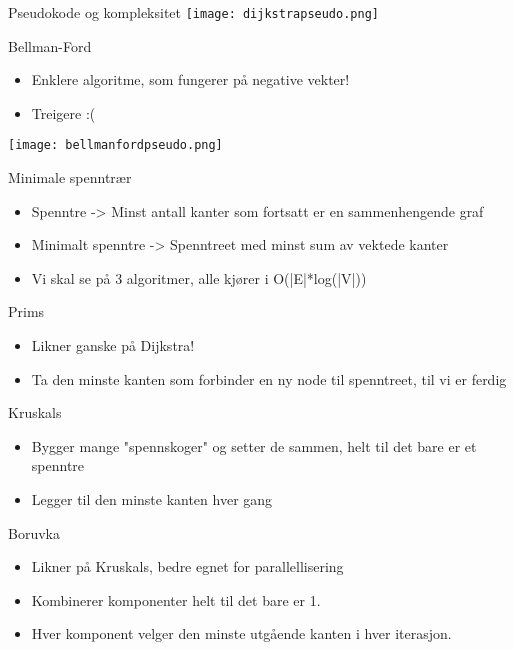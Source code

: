 \documentclass[norsk, handout]{beamer}
\begin{document}
	\begin{frame}{Pseudokode og kompleksitet}
		\texttt{[image: dijkstrapseudo.png]}
	\end{frame}

	\begin{frame}{Bellman-Ford}
		\begin{itemize}
			\item Enklere algoritme, som fungerer på negative vekter!
			\item Treigere :(
		\end{itemize}
		\texttt{[image: bellmanfordpseudo.png]}
	\end{frame}

	\begin{frame}{Minimale spenntrær}
		\begin{itemize}
			\item Spenntre -> Minst antall kanter som fortsatt er en sammenhengende graf
			\item Minimalt spenntre -> Spenntreet med minst sum av vektede kanter
			\item Vi skal se på 3 algoritmer, alle kjører i O(|E|*log(|V|))
		\end{itemize}
	\end{frame}

	\begin{frame}{Prims}
		\begin{itemize}
			\item Likner ganske på Dijkstra!
			\item Ta den minste kanten som forbinder en ny node til spenntreet, til vi er
				ferdig
		\end{itemize}
	\end{frame}

	\begin{frame}{Kruskals}
		\begin{itemize}
			\item Bygger mange "spennskoger" og setter de sammen, helt til det bare er et
				spenntre
			\item Legger til den minste kanten hver gang
		\end{itemize}
	\end{frame}

	\begin{frame}{Boruvka}

	\begin{itemize}
		\item Likner på Kruskals, bedre egnet for parallellisering
		\item Kombinerer komponenter helt til det bare er 1.
		\item Hver komponent velger den minste utgående kanten i hver iterasjon.
	\end{itemize}

	\end{frame}
\end{document}
